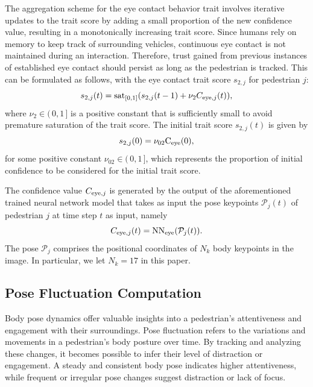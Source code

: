 \documentclass[journal]{IEEEtran}
\begin{document}
The aggregation scheme for the eye contact behavior trait involves iterative updates to the trait score by adding a small proportion of the new confidence value, resulting in a monotonically increasing trait score. Since humans rely on memory to keep track of surrounding vehicles, continuous eye contact is not maintained during an interaction. Therefore, trust gained from previous instances of established eye contact should persist as long as the pedestrian is tracked. This can be formulated as follows, with the eye contact trait score $s_{2, j}$ for pedestrian $j$:
\begin{equation}
    s_{2,j}(t) = \mbox{sat}_{[0,1]}(s_{2,j}(t-1) + \nu_2 {C}_{{\rm eye},j}(t)),
\label{eye_score}
\end{equation}
where $\nu_2\in (\,0,1\,]$ is a positive constant that is sufficiently small to avoid premature saturation of the trait score. The initial trait score $s_{2, j}(t)$ is given by
\begin{equation*}
    s_{2,j}(0) = \nu_{02}{\rm C}_{\rm eye}(0),
\end{equation*}
for some positive constant $\nu_{02}\in (\,0,1\,]$, which represents the proportion of initial confidence to be considered  for the initial trait score.

The confidence value ${C}_{{\rm eye},j}$ is generated by the output of the aforementioned trained neural network model that takes as input the pose keypoints $\mathcal{P}_j(t)$ of pedestrian $j$ at time step $t$ as input, namely
\begin{equation*}
{C}_{{\rm eye},j}(t) = {\rm NN}_{\rm eye}(\mathcal{P}_{j}(t)). \nonumber
\end{equation*}
The pose $\mathcal{P}_j$ comprises the positional coordinates of $N_k$ body keypoints in the image. In particular, we let $N_k = 17$ in this paper.

\subsection{Pose Fluctuation Computation}
Body pose dynamics offer valuable insights into a pedestrian's attentiveness and engagement with their surroundings. Pose fluctuation refers to the variations and movements in a pedestrian's body posture over time. By tracking and analyzing these changes, it becomes possible to infer their level of distraction or engagement. A steady and consistent body pose indicates higher attentiveness, while frequent or irregular pose changes suggest distraction or lack of focus.
\end{document}
